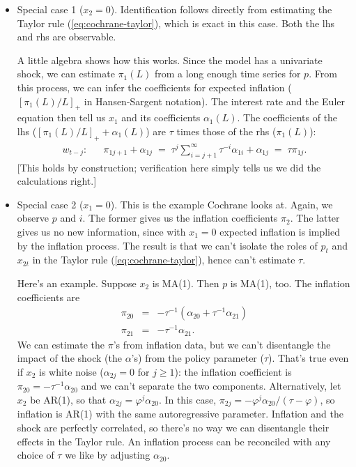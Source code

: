 \documentclass[11pt]{article}
\begin{document}
{\begin{itemize}
\item Special case 1 ($x_2=0$).
Identification follows directly from estimating the
Taylor rule (\ref{eq:cochrane-taylor}),
which is exact in this case.
Both the lhs and rhs are observable.

A little algebra shows how this works.
Since the model has a univariate shock,
we can estimate $ \pi_1(L)$ from a long enough time series for $p$.
From this process, we can infer the coefficients for expected inflation
($[\pi_1(L)/L]_+$ in Hansen-Sargent notation).
The interest rate and the Euler equation then tell us $x_1$
and its coefficients $\alpha_1(L)$.
The coefficients of the lhs ($[\pi_1(L)/L]_+ + \alpha_1(L)$) are
$\tau$ times those of the rhs ($\pi_1(L)$):
\begin{eqnarray*}
    w_{t-j}:  &&  \pi_{1j+1} + \alpha_{1j} \;=\;
                \tau^j \sum_{i=j+1}^{\infty} \tau^{-i} \alpha_{1i}
                    + \alpha_{1j}
                \;=\; \tau \pi_{1j} .
\end{eqnarray*}
[This holds by construction; verification here simply
tells us we did the calculations right.]


\item Special case 2 ($x_1=0$).
This is the example Cochrane looks at.
Again, we observe $p$ and $i$.
The former gives us the inflation coefficients $\pi_2$.
The latter gives us no new information,
since with $x_1=0$
expected inflation is implied by the inflation process.
The result is that we can't isolate the roles of $p_t$ and $x_{2t}$
in the Taylor rule (\ref{eq:cochrane-taylor}), hence can't estimate $\tau$.

Here's an example.
Suppose $x_2$ is MA(1).  Then $p$ is MA(1), too.
The inflation coefficients are
\begin{eqnarray*}
    \pi_{20} &=& - \tau^{-1} (\alpha_{20} + \tau^{-1} \alpha_{21} ) \\
    \pi_{21} &=& - \tau^{-1} \alpha_{21} .
\end{eqnarray*}
We can estimate the $\pi$'s from inflation data,
but we can't disentangle the impact
of the shock (the $\alpha$'s) from the policy parameter ($\tau$).
That's true even if $x_2$ is white noise ($\alpha_{2j} = 0$ for $j \geq 1$):
the inflation coefficient is $\pi_{20} = - \tau^{-1} \alpha_{20}$ and we
can't separate the two components.
Alternatively, let $x_2$ be AR(1), so that
$ \alpha_{2j} = \varphi^j \alpha_{20} $.
In this case, $ \pi_{2j} = - \varphi^j \alpha_{20} /(\tau-\varphi)$,
so inflation is AR(1) with the same autoregressive parameter.
Inflation and the shock are perfectly correlated, so
there's no way we can disentangle their effects in the Taylor rule.
An inflation process can be reconciled with any choice of $\tau$ we
like by adjusting $\alpha_{20}$.




\end{itemize}}
\end{document}
